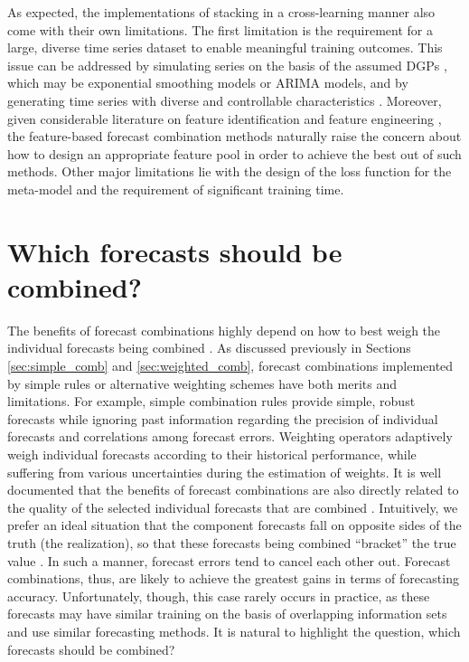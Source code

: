 \documentclass[11pt]{article}
\newcommand{\pkg}[1]{{\normalfont\fontseries{b}\selectfont #1}}
\let\proglang=\textsf
\begin{document}
As expected, the implementations of stacking in a cross-learning manner also come with their own limitations. The first limitation is the requirement for a large, diverse time series dataset to enable meaningful training outcomes. This issue can be addressed by simulating series on the basis of the assumed DGPs \citep{talagala2018meta} \citep[implemented using the \proglang{R} package \pkg{forecast},][]{rforecast}, which may be exponential smoothing models or ARIMA models, and by generating time series with diverse and controllable characteristics \citep{Kang2020-rl} \citep[implemented in the \proglang{R} package \pkg{gratis},][]{rgratis}. Moreover, given considerable literature on feature identification and feature engineering \citep[e.g.,][]{Wang2009-hs,Kang2017-wt,Lemke2010-wn,Montero-Manso2020-tq,Li2020-od}, the feature-based forecast combination methods naturally raise the concern about how to design an appropriate feature pool in order to achieve the best out of such methods. Other major limitations lie with the design of the loss function for the meta-model and the requirement of significant training time.


\section{Which forecasts should be combined?}
\label{sec:forecasts}

The benefits of forecast combinations highly depend on how to best weigh the individual forecasts being combined \citep{Stock2004-rq,Timmermann2006-en}. As discussed previously in Sections \ref{sec:simple_comb} and \ref{sec:weighted_comb}, forecast combinations implemented by simple rules or alternative weighting schemes have both merits and limitations. For example, simple combination rules provide simple, robust forecasts while ignoring past information regarding the precision of individual forecasts and correlations among forecast errors. Weighting operators adaptively weigh individual forecasts according to their historical performance, while suffering from various uncertainties during the estimation of weights. It is well documented that the benefits of forecast combinations are also directly related to the quality of the selected individual forecasts that are combined \citep{Batchelor1995-ps,Geweke2011-xk}. Intuitively, we prefer an ideal situation that the component forecasts fall on opposite sides of the truth (the realization), so that these forecasts being combined ``bracket'' the true value \citep{Bates1969-yj,Larrick2006-sr}. In such a manner, forecast errors tend to cancel each other out. Forecast combinations, thus, are likely to achieve the greatest gains in terms of forecasting accuracy. Unfortunately, though, this case rarely occurs in practice, as these forecasts may have similar training on the basis of overlapping information sets and use similar forecasting methods. It is natural to highlight the question, which forecasts should be combined?
\end{document}
